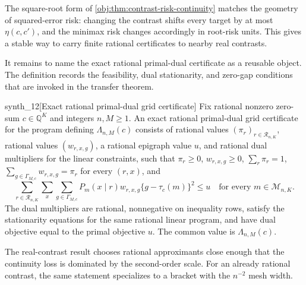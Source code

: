The square-root form of \cref{obj:thm:contrast-risk-continuity} matches the geometry of squared-error risk: changing the contrast shifts every target by at most \(\eta(c,c')\), and the minimax risk changes accordingly in root-risk units. This gives a stable way to carry finite rational certificates to nearby real contrasts.

It remains to name the exact rational primal-dual certificate as a reusable object. The definition records the feasibility, dual stationarity, and zero-gap conditions that are invoked in the transfer theorem.

\begin{definitionv}{synth_12}[Exact rational primal-dual grid certificate]
Fix rational nonzero zero-sum $c\in\mathbb Q^K$ and integers $n,M\ge1$. An exact rational primal-dual grid certificate for the program defining $\Lambda_{n,M}(c)$ consists of rational values $(\pi_r)_{r\in\mathcal R_{n,K}}$, rational values $(w_{r,x,g})$, a rational epigraph value $u$, and rational dual multipliers for the linear constraints, such that $\pi_r\ge0$, $w_{r,x,g}\ge0$, $\sum_r\pi_r=1$, $\sum_{g\in\Gamma_{M,c}}w_{r,x,g}=\pi_r$ for every $(r,x)$, and
\[
\sum_{r\in\mathcal R_{n,K}}\sum_x\sum_{g\in\Gamma_{M,c}}P_m(x\mid r)w_{r,x,g}\{g-\tau_c(m)\}^2\le u
\quad\text{for every }m\in\mathcal M_{n,K}.
\]
The dual multipliers are rational, nonnegative on inequality rows, satisfy the stationarity equations for the same rational linear program, and have dual objective equal to the primal objective $u$. The common value is $\Lambda_{n,M}(c)$.
\end{definitionv}

The real-contrast result chooses rational approximants close enough that the continuity loss is dominated by the second-order scale. For an already rational contrast, the same statement specializes to a bracket with the \(n^{-2}\) mesh width.

